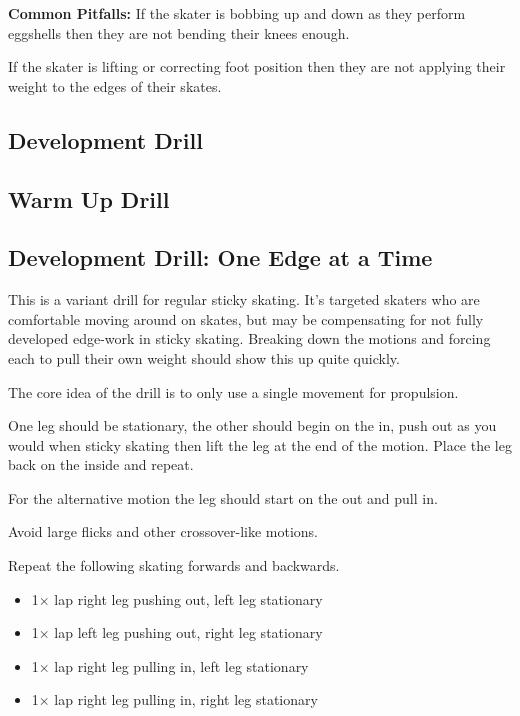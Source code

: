 {\bf Common Pitfalls: }
If the skater is bobbing up and down as they perform eggshells then they are not bending their knees enough. 


If the skater is lifting or correcting foot position then they are not applying their weight to the edges of their skates.  

\subsection*{Development Drill}

\subsection*{Warm Up Drill}

\subsection*{Development Drill: One Edge at a Time}
\label{drill:sticky/eggshells/one_edge}

This is a variant drill for regular sticky skating. 
It's targeted skaters who are comfortable moving around on skates, but may be compensating for not fully developed edge-work in sticky skating.
Breaking down the motions and forcing each to pull their own weight should show this up quite quickly.

The core idea of the drill is to only use a single movement for propulsion.  

One leg should be stationary, the other should begin on the in, push out as you would when sticky skating then lift the leg at the end of the motion.  
Place the leg back on the inside and repeat. 

For the alternative motion the leg should start on the out and pull in.   

Avoid large flicks and other crossover-like motions.    

Repeat the following skating forwards and backwards. 
\begin{itemize}
    \item 1$\times$ lap right leg pushing out, left leg stationary  
    \item 1$\times$ lap left leg pushing out, right leg stationary 
    \item 1$\times$ lap right leg pulling in, left leg stationary 
    \item 1$\times$ lap right leg pulling in, right leg stationary 
\end{itemize}

